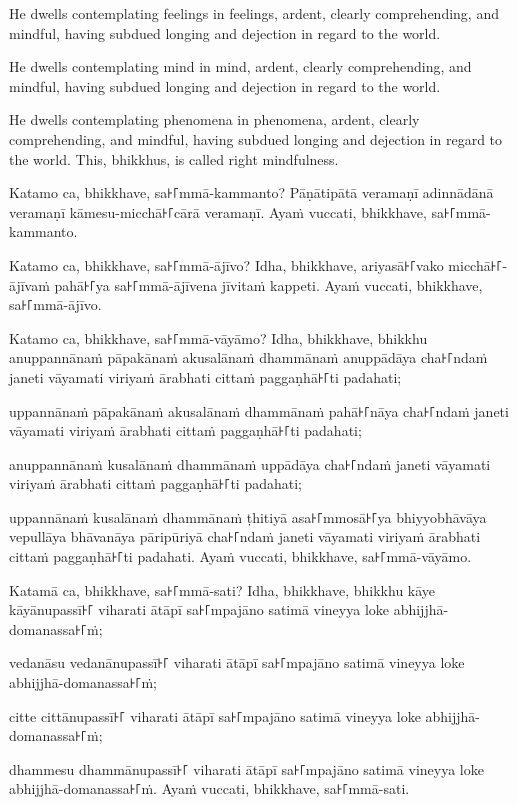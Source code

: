 He dwells contemplating feelings in feelings, ardent, clearly comprehending, and
mindful, having subdued longing and dejection in regard to the world.

He dwells contemplating mind in mind, ardent, clearly comprehending, and
mindful, having subdued longing and dejection in regard to the world.

He dwells contemplating phenomena in phenomena, ardent, clearly comprehending,
and mindful, having subdued longing and dejection in regard to the world. This,
bhikkhus, is called right mindfulness.

\paliPage

Katamo ca, bhikkhave, sa꜔꜒mmā-kammanto? Pāṇātipātā veramaṇī adinnādānā veramaṇī
kāmesu-micchā꜔꜒cārā veramaṇī. Ayaṁ vuccati, bhikkhave, sa꜔꜒mmā-kammanto.

Katamo ca, bhikkhave, sa꜔꜒mmā-ājīvo? Idha, bhikkhave, ariyasā꜔꜒vako micchā꜔꜒-ājīvaṁ
pahā꜔꜒ya sa꜔꜒mmā-ājīvena jīvitaṁ kappeti. Ayaṁ vuccati, bhikkhave, sa꜔꜒mmā-ājīvo.

Katamo ca, bhikkhave, sa꜔꜒mmā-vāyāmo? Idha, bhikkhave, bhikkhu
anuppannānaṁ pāpakānaṁ akusalānaṁ dhammānaṁ
anuppādāya cha꜔꜒ndaṁ janeti vāyamati viriyaṁ ārabhati cittaṁ paggaṇhā꜔꜒ti padahati;

uppannānaṁ pāpakānaṁ akusalānaṁ dhammānaṁ
pahā꜔꜒nāya cha꜔꜒ndaṁ janeti vāyamati viriyaṁ ārabhati cittaṁ paggaṇhā꜔꜒ti padahati;

anuppannānaṁ kusalānaṁ dhammānaṁ
uppādāya cha꜔꜒ndaṁ janeti vāyamati viriyaṁ ārabhati cittaṁ paggaṇhā꜔꜒ti padahati;

uppannānaṁ kusalānaṁ dhammānaṁ
ṭhitiyā asa꜔꜒mmosā꜔꜒ya bhiyyobhāvāya vepullāya
bhāvanāya pāripūriyā cha꜔꜒ndaṁ janeti vāyamati viriyaṁ ārabhati cittaṁ paggaṇhā꜔꜒ti
padahati. Ayaṁ vuccati, bhikkhave, sa꜔꜒mmā-vāyāmo.

Katamā ca, bhikkhave, sa꜔꜒mmā-sati? Idha, bhikkhave, bhikkhu kāye kāyānupassī꜔꜒
viharati ātāpī sa꜔꜒mpajāno satimā vineyya loke abhijjhā-domanassa꜔꜒ṁ;

vedanāsu vedanānupassī꜔꜒ viharati ātāpī sa꜔꜒mpajāno satimā vineyya loke
abhijjhā-domanassa꜔꜒ṁ;

\enlargethispage{\baselineskip}

citte cittānupassī꜔꜒ viharati ātāpī sa꜔꜒mpajāno satimā vineyya loke
abhijjhā-domanassa꜔꜒ṁ;

dhammesu dhammānupassī꜔꜒ viharati ātāpī sa꜔꜒mpajāno satimā vineyya loke
abhijjhā-domanassa꜔꜒ṁ. Ayaṁ vuccati, bhikkhave, sa꜔꜒mmā-sati.

\englishPage

